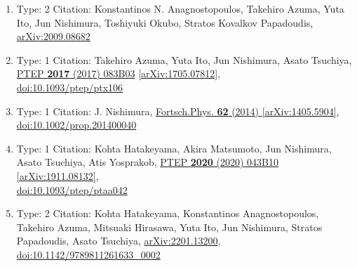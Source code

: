 \documentclass[a4paper,10pt]{article}
\begin{document}
\begin{enumerate}
\begin{enumerate}
  \item Type: 2 Citation: Konstantinos N. Anagnostopoulos, Takehiro Azuma, Yuta Ito, Jun Nishimura, Toshiyuki Okubo, Stratos Kovalkov Papadoudis, \href{https://arxiv.org/abs/2009.08682}{arXiv:2009.08682}
  \item Type: 1 Citation: Takehiro Azuma, Yuta Ito, Jun Nishimura, Asato Tsuchiya, \href{https://www.doi.org/10.1093/ptep/ptx106}{PTEP {\bf 2017} (2017) 083B03}  \href{https://arxiv.org/abs/1705.07812}{[arXiv:1705.07812]},\\\href{https://www.doi.org/10.1093/ptep/ptx106}{doi:10.1093/ptep/ptx106}
  \item Type: 1 Citation: J. Nishimura, \href{https://www.doi.org/10.1002/prop.201400040}{Fortsch.Phys. {\bf 62} (2014) }  \href{https://arxiv.org/abs/1405.5904}{[arXiv:1405.5904]},\\\href{https://www.doi.org/10.1002/prop.201400040}{doi:10.1002/prop.201400040}
  \item Type: 1 Citation: Kohta Hatakeyama, Akira Matsumoto, Jun Nishimura, Asato Tsuchiya, Atis Yosprakob, \href{https://www.doi.org/10.1093/ptep/ptaa042}{PTEP {\bf 2020} (2020) 043B10}  \href{https://arxiv.org/abs/1911.08132}{[arXiv:1911.08132]},\\\href{https://www.doi.org/10.1093/ptep/ptaa042}{doi:10.1093/ptep/ptaa042}
  \item Type: 2 Citation: Kohta Hatakeyama, Konstantinos Anagnostopoulos, Takehiro Azuma, Mitsuaki Hirasawa, Yuta Ito, Jun Nishimura, Stratos Papadoudis, Asato Tsuchiya, \href{https://arxiv.org/abs/2201.13200}{arXiv:2201.13200},\\\href{https://www.doi.org/10.1142/9789811261633_0002}{doi:10.1142/9789811261633\_0002}

\end{enumerate}
\end{enumerate}
\end{document}
